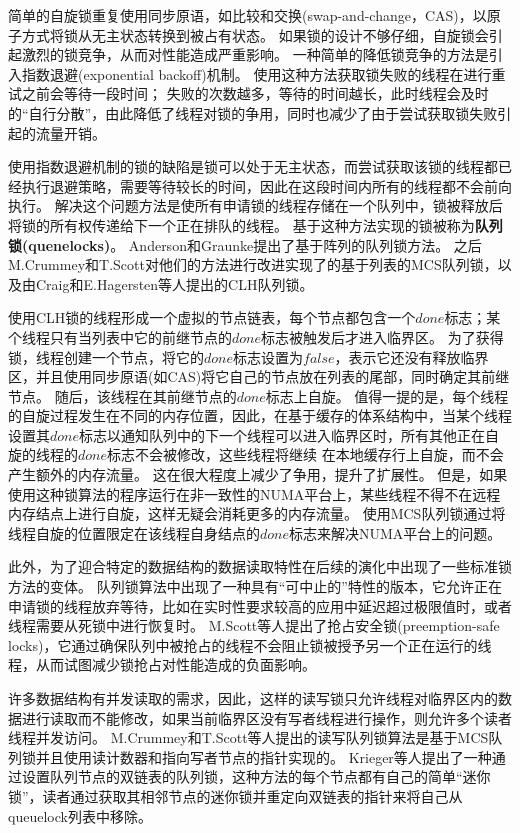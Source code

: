 简单的自旋锁重复使用同步原语，如比较和交换(swap-and-change，CAS)，以原子方式将锁从无主状态转换到被占有状态。 如果锁的设计不够仔细，自旋锁会引起激烈的锁竞争，从而对性能造成严重影响。
一种简单的降低锁竞争的方法是引入指数退避(exponential backoff)机制\cite{agarwal1989adaptive}。
使用这种方法获取锁失败的线程在进行重试之前会等待一段时间；
失败的次数越多，等待的时间越长，此时线程会及时的“自行分散”，由此降低了线程对锁的争用，同时也减少了由于尝试获取锁失败引起的流量开销。

使用指数退避机制的锁的缺陷是锁可以处于无主状态，而尝试获取该锁的线程都已经执行退避策略，需要等待较长的时间，因此在这段时间内所有的线程都不会前向执行。
解决这个问题方法是使所有申请锁的线程存储在一个队列中，锁被释放后将锁的所有权传递给下一个正在排队的线程。
基于这种方法实现的锁被称为\textbf{队列锁(quenelocks)}。
Anderson\cite{anderson1989performance}和Graunke\cite{graunke1990synchronization}提出了基于阵列的队列锁方法。
之后M.Crummey和T.Scott\cite{mellor1991algorithms}对他们的方法进行改进实现了的基于列表的MCS队列锁，以及由Craig和E.Hagersten等人\cite{craig1993building,magnusson1994queue}提出的CLH队列锁。

使用CLH锁的线程形成一个虚拟的节点链表，每个节点都包含一个$done$标志；某个线程只有当列表中它的前继节点的$done$标志被触发后才进入临界区。
为了获得锁，线程创建一个节点，将它的$done$标志设置为$false$，表示它还没有释放临界区，并且使用同步原语(如CAS)将它自己的节点放在列表的尾部，同时确定其前继节点。
随后，该线程在其前继节点的$done$标志上自旋。
值得一提的是，每个线程的自旋过程发生在不同的内存位置，因此，在基于缓存的体系结构中，当某个线程设置其$done$标志以通知队列中的下一个线程可以进入临界区时，所有其他正在自旋的线程的$done$标志不会被修改，这些线程将继续 在本地缓存行上自旋，而不会产生额外的内存流量。
这在很大程度上减少了争用，提升了扩展性。
但是，如果使用这种锁算法的程序运行在非一致性的NUMA平台上，某些线程不得不在远程内存结点上进行自旋，这样无疑会消耗更多的内存流量。
使用MCS队列锁\cite{mellor1991algorithms}通过将线程自旋的位置限定在该线程自身结点的$done$标志来解决NUMA平台上的问题。

此外，为了迎合特定的数据结构的数据读取特性在后续的演化中出现了一些标准锁方法的变体。
队列锁算法中出现了一种具有“可中止的”特性的版本，它允许正在申请锁的线程放弃等待，比如在实时性要求较高的应用中延迟超过极限值时\cite{scott2002non,scott2001scalable}，或者线程需要从死锁中进行恢复时。
M.Scott等人提出了抢占安全锁(preemption-safe locks)\cite{michael1998nonblocking}，它通过确保队列中被抢占的线程不会阻止锁被授予另一个正在运行的线程，从而试图减少锁抢占对性能造成的负面影响。

许多数据结构有并发读取的需求，因此，这样的读写锁只允许线程对临界区内的数据进行读取而不能修改，如果当前临界区没有写者线程进行操作，则允许多个读者线程并发访问。
M.Crummey和T.Scott等人提出的读写队列锁算法是基于MCS队列锁并且使用读计数器和指向写者节点的指针实现的\cite{mellor1991scalable}。
Krieger等人\cite{krieger1993fair}提出了一种通过设置队列节点的双链表的队列锁，这种方法的每个节点都有自己的简单“迷你锁”，读者通过获取其相邻节点的迷你锁并重定向双链表的指针来将自己从queuelock列表中移除。


